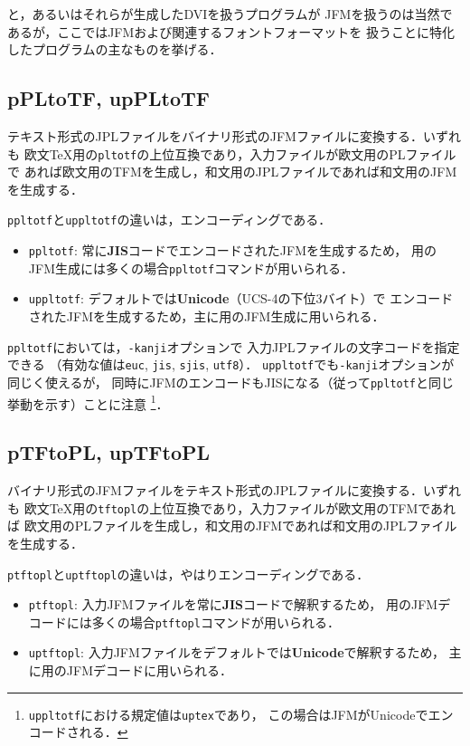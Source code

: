 \documentclass[a4paper,11pt,nomag]{jsarticle}
\def\code#1{\texttt{#1}}
\begin{document}
\pTeX と\upTeX ，あるいはそれらが生成したDVIを扱うプログラムが
JFMを扱うのは当然であるが，ここではJFMおよび関連するフォントフォーマットを
扱うことに特化したプログラムの主なものを挙げる．

\subsection{pPLtoTF, upPLtoTF}

テキスト形式のJPLファイルをバイナリ形式のJFMファイルに変換する．いずれも
欧文\TeX 用の\code{pltotf}の上位互換であり，入力ファイルが欧文用のPLファイルで
あれば欧文用のTFMを生成し，和文用のJPLファイルであれば和文用のJFMを生成する．

\code{ppltotf}と\code{uppltotf}の違いは，エンコーディングである．
\begin{itemize}
  \item \code{ppltotf}: 常に\textbf{JIS}コードでエンコードされたJFMを生成するため，
    \pTeX 用のJFM生成には多くの場合\code{ppltotf}コマンドが用いられる．
  \item \code{uppltotf}: デフォルトでは\textbf{Unicode}（UCS-4の下位3バイト）で
    エンコードされたJFMを生成するため，主に\upTeX 用のJFM生成に用いられる．
\end{itemize}

\code{ppltotf}においては，\code{-kanji}オプションで
入力JPLファイルの文字コードを指定できる
（有効な値は\code{euc}, \code{jis}, \code{sjis}, \code{utf8}）．
\code{uppltotf}でも\code{-kanji}オプションが同じく使えるが，
同時にJFMのエンコードもJISになる（従って\code{ppltotf}と同じ挙動を示す）ことに注意
\footnote{\code{uppltotf}における規定値は\code{uptex}であり，
この場合はJFMがUnicodeでエンコードされる．}．

\subsection{pTFtoPL, upTFtoPL}

バイナリ形式のJFMファイルをテキスト形式のJPLファイルに変換する．いずれも
欧文\TeX 用の\code{tftopl}の上位互換であり，入力ファイルが欧文用のTFMであれば
欧文用のPLファイルを生成し，和文用のJFMであれば和文用のJPLファイルを生成する．

\code{ptftopl}と\code{uptftopl}の違いは，やはりエンコーディングである．
\begin{itemize}
  \item \code{ptftopl}: 入力JFMファイルを常に\textbf{JIS}コードで解釈するため，
    \pTeX 用のJFMデコードには多くの場合\code{ptftopl}コマンドが用いられる．
  \item \code{uptftopl}: 入力JFMファイルをデフォルトでは\textbf{Unicode}で解釈するため，
    主に\upTeX 用のJFMデコードに用いられる．
\end{itemize}
\end{document}
